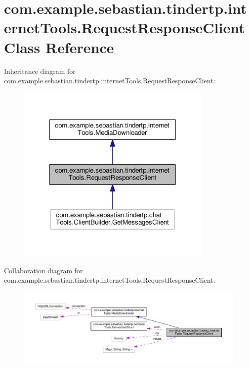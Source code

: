 \hypertarget{classcom_1_1example_1_1sebastian_1_1tindertp_1_1internetTools_1_1RequestResponseClient}{}\section{com.\+example.\+sebastian.\+tindertp.\+internet\+Tools.\+Request\+Response\+Client Class Reference}
\label{classcom_1_1example_1_1sebastian_1_1tindertp_1_1internetTools_1_1RequestResponseClient}


Inheritance diagram for com.\+example.\+sebastian.\+tindertp.\+internet\+Tools.\+Request\+Response\+Client\+:
\nopagebreak
\begin{figure}[H]
\begin{center}
\leavevmode
\includegraphics[width=270pt]{classcom_1_1example_1_1sebastian_1_1tindertp_1_1internetTools_1_1RequestResponseClient__inherit__graph}
\end{center}
\end{figure}


Collaboration diagram for com.\+example.\+sebastian.\+tindertp.\+internet\+Tools.\+Request\+Response\+Client\+:
\nopagebreak
\begin{figure}[H]
\begin{center}
\leavevmode
\includegraphics[width=350pt]{classcom_1_1example_1_1sebastian_1_1tindertp_1_1internetTools_1_1RequestResponseClient__coll__graph}
\end{center}
\end{figure}
